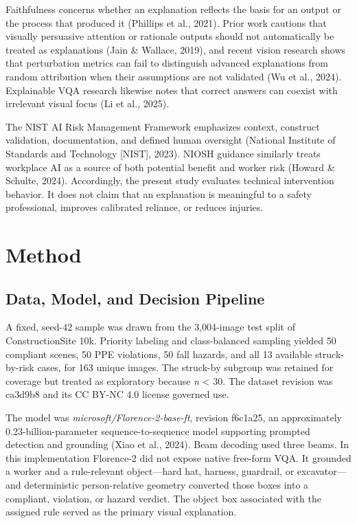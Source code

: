 \documentclass[12pt,letterpaper,twoside]{article}
\begin{document}
Faithfulness concerns whether an explanation reflects the basis for an output or the process that produced it (Phillips et al., 2021). Prior work cautions that visually persuasive attention or rationale outputs should not automatically be treated as explanations (Jain \& Wallace, 2019), and recent vision research shows that perturbation metrics can fail to distinguish advanced explanations from random attribution when their assumptions are not validated (Wu et al., 2024). Explainable VQA research likewise notes that correct answers can coexist with irrelevant visual focus (Li et al., 2025).

The NIST AI Risk Management Framework emphasizes context, construct validation, documentation, and defined human oversight (National Institute of Standards and Technology [NIST], 2023). NIOSH guidance similarly treats workplace AI as a source of both potential benefit and worker risk (Howard \& Schulte, 2024). Accordingly, the present study evaluates technical intervention behavior. It does not claim that an explanation is meaningful to a safety professional, improves calibrated reliance, or reduces injuries.

\section{Method}

\subsection{Data, Model, and Decision Pipeline}

A fixed, seed-42 sample was drawn from the 3,004-image test split of ConstructionSite 10k. Priority labeling and class-balanced sampling yielded 50 compliant scenes, 50 PPE violations, 50 fall hazards, and all 13 available struck-by-risk cases, for 163 unique images. The struck-by subgroup was retained for coverage but treated as exploratory because \textit{n} < 30. The dataset revision was ca3d9b8 and its CC BY-NC 4.0 license governed use.

The model was \textit{microsoft/Florence-2-base-ft}, revision f6c1a25, an approximately 0.23-billion-parameter sequence-to-sequence model supporting prompted detection and grounding (Xiao et al., 2024). Beam decoding used three beams. In this implementation Florence-2 did not expose native free-form VQA. It grounded a worker and a rule-relevant object---hard hat, harness, guardrail, or excavator---and deterministic person-relative geometry converted those boxes into a compliant, violation, or hazard verdict. The object box associated with the assigned rule served as the primary visual explanation.
\end{document}
